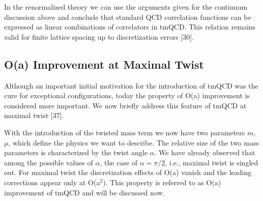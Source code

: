 In the renormalized theory we can use the arguments given for the continuum
discussion above and conclude that standard QCD correlation functions can be
expressed as linear combinations of correlators in tmQCD. This relation
remains valid for finite lattice spacing up to discretization errors [30].

\subsection{O(a) Improvement at Maximal Twist}

Although an important initial motivation for the introduction of tmQCD was the
cure for exceptional configurations, today the property of O(a) improvement is
considered more important. We now briefly address this feature of tmQCD at
maximal twist [37].

With the introduction of the twisted mass term we now have two parameters $m$,
$\mu$, which define the physics we want to describe. The relative size of the
two mass parameters is characterized by the twist angle $\alpha$. We have
already observed that among the possible values of $\alpha$, the case of
$\alpha = \pi/2$, i.e., maximal twist is singled out. For maximal twist the
discretization effects of O(a) vanish and the leading corrections appear only
at O(a$^2$). This property is referred to as O(a) improvement of tmQCD and
will be discussed now.

